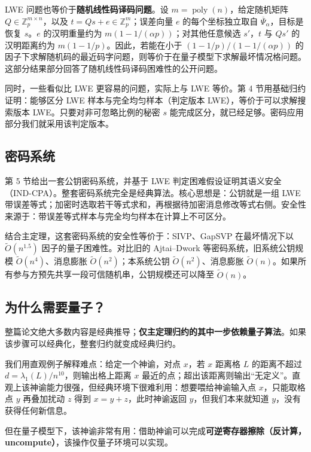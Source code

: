 \documentclass[11pt,a4paper]{article}
\DeclareMathOperator{\poly}{poly}
\newcommand{\Z}{\mathbb{Z}}
\newcommand{\Psibar}{\overline{\Psi}}
\begin{document}
LWE 问题也等价于\textbf{随机线性码译码问题}。设 $m=\poly(n)$，给定随机矩阵 $Q\in\Z_{p}^{m\times n}$，以及 $t=Qs+e\in\Z_{p}^{m}$；误差向量 $e$ 的每个坐标独立取自 $\Psibar_{\alpha}$，目标是恢复 $s$。$e$ 的汉明重量约为 $m(1-1/(\alpha p))$；对其他任意候选 $s'$，$t$ 与 $Qs'$ 的汉明距离约为 $m(1-1/p)$。因此，若能在小于 $(1-1/p)/(1-1/(\alpha p))$ 的因子下求解随机码的最近码字问题，则等价于在量子模型下求解最坏情况格问题。这部分结果部分回答了随机线性码译码困难性的公开问题。

同时，一些看似比 LWE 更容易的问题，实际上与 LWE 等价。第 4 节用基础归约证明：能够区分 LWE 样本与完全均匀样本（判定版本 LWE），等价于可以求解搜索版本 LWE。只要对非可忽略比例的秘密 $s$ 能完成区分，就已经足够。密码应用部分我们就采用该判定版本。

\subsection{密码系统}

第 5 节给出一套公钥密码系统，并基于 LWE 判定困难假设证明其语义安全（IND-CPA）。整套密码系统完全是经典算法。核心思想是：公钥就是一组 LWE 带误差等式；加密时选取若干等式求和，再根据待加密消息修改等式右侧。安全性来源于：带误差等式样本与完全均匀样本在计算上不可区分。

结合主定理，这套密码系统的安全性等价于：SIVP、GapSVP 在最坏情况下以 $\widetilde{O}(n^{1.5})$ 因子的量子困难性。对比旧的 Ajtai--Dwork 等密码系统，旧系统公钥规模 $\widetilde{O}(n^{4})$、消息膨胀 $\widetilde{O}(n^{2})$；本系统公钥 $\widetilde{O}(n^{2})$、消息膨胀 $\widetilde{O}(n)$。如果所有参与方预先共享一段可信随机串，公钥规模还可以降至 $\widetilde{O}(n)$。

\subsection{为什么需要量子？}

整篇论文绝大多数内容是经典推导；\textbf{仅主定理归约的其中一步依赖量子算法}。如果该步骤可以经典化，整套归约就变成经典归约。

我们用直观例子解释难点：给定一个神谕，对点 $x$，若 $x$ 距离格 $L$ 的距离不超过 $d=\lambda_{1}(L)/n^{10}$，则输出格上距离 $x$ 最近的点；超出该距离则输出``无定义''。直观上该神谕能力很强，但经典环境下很难利用：想要喂给神谕输入点 $x$，只能取格点 $y$ 再叠加扰动 $z$ 得到 $x=y+z$，此时神谕返回 $y$，但我们本来就知道 $y$，没有获得任何新信息。

但在量子模型下，该神谕非常有用：借助神谕可以完成\textbf{可逆寄存器擦除（反计算，uncompute）}，该操作仅量子环境可以实现。
\end{document}
